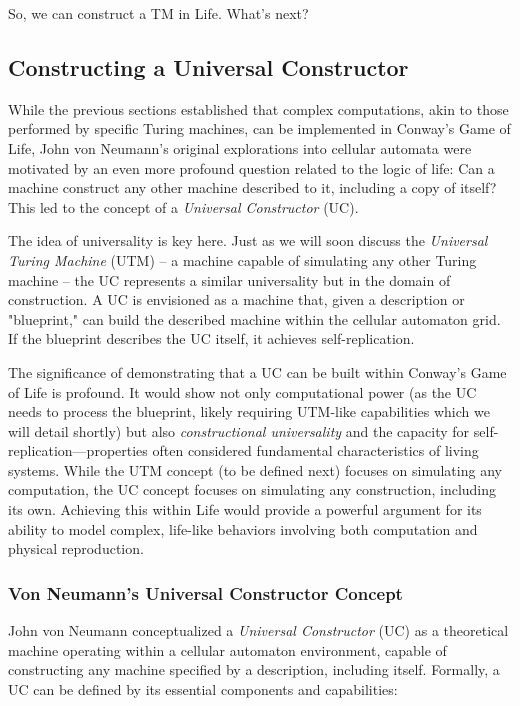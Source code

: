 \documentclass{article}
\theoremstyle{definition}
\theoremstyle{plain}
\theoremstyle{plain}
\begin{document}
So, we can construct a TM in Life. What's next?

\subsection{Constructing a Universal Constructor}
While the previous sections established that complex computations, akin to those performed by specific Turing machines, can be implemented in Conway's Game of Life, John von Neumann's original explorations into cellular automata were motivated by an even more profound question related to the logic of life: Can a machine construct any other machine described to it, including a copy of itself? This led to the concept of a \textit{Universal Constructor} (UC).

The idea of universality is key here. Just as we will soon discuss the \textit{Universal Turing Machine} (UTM) – a machine capable of simulating any other Turing machine – the UC represents a similar universality but in the domain of construction. A UC is envisioned as a machine that, given a description or "blueprint," can build the described machine within the cellular automaton grid. If the blueprint describes the UC itself, it achieves self-replication.

The significance of demonstrating that a UC can be built within Conway's Game of Life is profound. It would show not only computational power (as the UC needs to process the blueprint, likely requiring UTM-like capabilities which we will detail shortly) but also \textit{constructional universality} and the capacity for self-replication—properties often considered fundamental characteristics of living systems. While the UTM concept (to be defined next) focuses on simulating any computation, the UC concept focuses on simulating any construction, including its own. Achieving this within Life would provide a powerful argument for its ability to model complex, life-like behaviors involving both computation and physical reproduction.

\subsubsection{Von Neumann's Universal Constructor Concept}
John von Neumann conceptualized a \textit{Universal Constructor} (UC) as a theoretical machine operating within a cellular automaton environment, capable of constructing any machine specified by a description, including itself. Formally, a UC can be defined by its essential components and capabilities:
\end{document}
